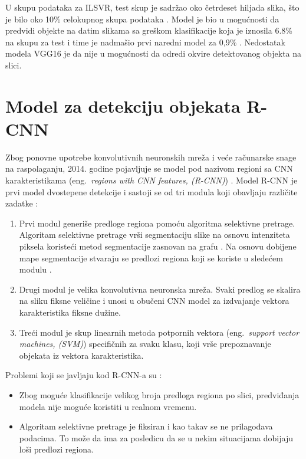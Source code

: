 \documentclass[12pt,oneside]{memoir}
\begin{document}
U skupu podataka za ILSVR, test skup je sadržao oko četrdeset hiljada slika, što je bilo oko 10\% celokupnog skupa podataka \cite{LSVRC2013}.  Model je bio u mogućnosti da predvidi objekte na datim slikama sa greškom klasifikacije koja je iznosila 6.8\% na skupu za test i time je nadmašio prvi naredni model za 0,9\% \cite{simonyan2014very}.
Nedostatak modela VGG16 je da nije u mogućnosti da odredi okvire detektovanog objekta na slici.



\section{Model za detekciju objekata R-CNN}

Zbog ponovne upotrebe konvolutivnih neuronskih mreža i veće računarske snage na raspolaganju, 2014. godine pojavljuje se model pod nazivom regioni sa CNN karakteristikama (eng.~\textit{regions with CNN features, (R-CNN)}) \cite{girshick2014rich}. 
Model R-CNN je prvi model dvostepene detekcije i sastoji se od tri modula koji obavljaju različite zadatke \cite{girshick2014rich}:
\begin{enumerate}
  \item Prvi modul generiše predloge regiona pomoću algoritma selektivne pretrage. Algoritam selektivne pretrage vrši segmentaciju slike na osnovu intenziteta piksela koristeći metod segmentacije zasnovan na grafu \cite{narayan2008image}. Na osnovu dobijene mape segmentacije stvaraju se predlozi regiona koji se koriste u sledećem modulu \cite{uijlings2013selective}.
  \item Drugi modul je velika konvolutivna neuronska mreža. Svaki predlog se skalira na sliku fiksne veličine i unosi u obučeni CNN model za izdvajanje vektora karakteristika fiksne dužine.
  \item Treći modul je skup linearnih metoda potpornih vektora (eng.~\textit{support vector machines, (SVM)}) specifičnih za svaku klasu, koji vrše prepoznavanje objekata iz vektora karakteristika.
\end{enumerate}


Problemi koji se javljaju kod R-CNN-a su \cite{gandhi_2018}:
\begin{itemize}
    \item Zbog moguće klasifikacije velikog broja predloga regiona po slici, predviđanja modela nije moguće koristiti u realnom vremenu.
    \item Algoritam selektivne pretrage je fiksiran i kao takav se ne prilagođava podacima. To može da ima za posledicu da se u nekim situacijama dobijaju loši predlozi regiona.
\end{itemize}
\end{document}
